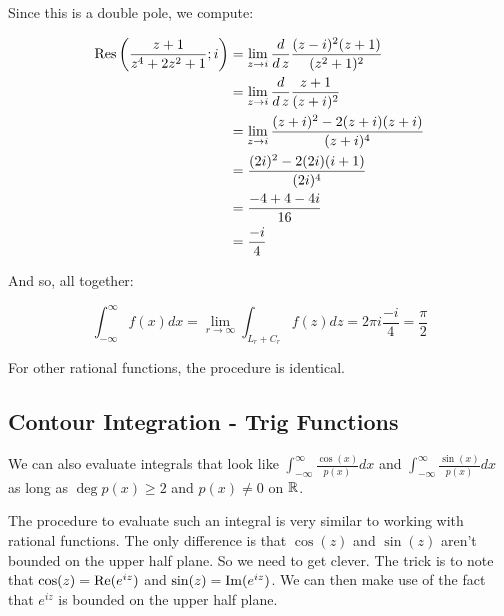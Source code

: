 \begin{ex}{}{}
Since this is a double pole, we compute:

\begin{align*}\mathrm{Res}\left(\frac{z+1}{z^4+2z^2 +1}; i\right) &= \lim_{z\rightarrow i} \frac{d}{d\,z} \frac{(z-i)^2(z+1)}{(z^2+1)^2}\\
&= \lim_{z\rightarrow i} \frac{d}{d\,z} \frac{z+1}{(z+i)^2}\\
&= \lim_{z\rightarrow i} \frac{(z+i)^2 -2(z+i)(z+i)}{(z+i)^4}\\
&=\frac{(2i)^2 - 2(2i)(i+1)}{(2i)^4}\\
&= \frac{-4 +4 -4i}{16}\\
&= \frac{-i}{4}
\end{align*}

And so, all together:

$$\int_{-\infty}^\infty f(x)dx = \lim_{r\rightarrow \infty} \int_{L_r+C_r}f(z)dz = 2\pi i\frac{-i}{4} = \frac{\pi}{2}$$

\end{ex}

For other rational functions, the procedure is identical.


\subsection{Contour Integration - Trig Functions}

We can also evaluate integrals that look like $\int_{-\infty}^\infty \frac{\cos(x)}{p(x)}dx$ and $\int_{-\infty}^\infty \frac{\sin(x)}{p(x)}dx$ as long as $\deg p(x) \ge 2$ and $p(x)\ne 0$ on $\mathbb{R}$.

The procedure to evaluate such an integral is very similar to working with rational functions. The only difference is that $\cos(z)$ and $\sin(z)$ aren't bounded on the upper half plane. So we need to get clever. The trick is to note that $\cos(z) = \operatorname{Re}(e^{iz})$ and $\sin(z) = \operatorname{Im}(e^{iz})$. We can then make use of the fact that $e^{iz}$ is bounded on the upper half plane.


